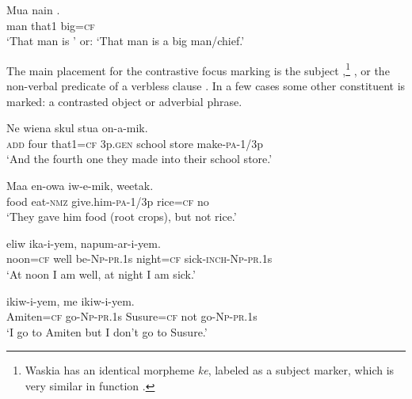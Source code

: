 \ea%
\label{ex:9:x1691}
\gll Mua  nain  . \\
man  that1  big=\textsc{cf}      \\
\glt`That man is \textsc{'} or: `That man is a big man/chief.'
\z


The main placement for the contrastive focus marking is the subject ,\footnote{Waskia has an identical morpheme \textit{ke}, labeled as a subject marker, which is very similar in function \citep[36]{RossEtAl1978}%
.} , or the non-verbal predicate of a verbless clause . In a few cases some other constituent is marked: a contrasted object or adverbial phrase.

\ea%
\label{ex:9:x1692}
\gll Ne     wiena  skul  stua  on-a-mik.\\
\textsc{add}  four  that1=\textsc{cf}  3p.\textsc{gen}  school  store  make-\textsc{pa}-1/3p\\
\glt`And the fourth one they made into their school store.'
\z


\ea%
\label{ex:9:x1697}
\gll Maa  en-owa  iw-e-mik,   weetak. \\
food  eat-\textsc{nmz}  give.him-\textsc{pa}-1/3p  rice=\textsc{cf}  no     \\
\glt`They gave him food (root crops), but not rice.'
\z


\ea%
\label{ex:9:x1693}
\gll {}  eliw  ika-i-yem,    napum-ar-i-yem. \\
noon=\textsc{cf}  well  be-\textsc{Np}-\textsc{pr}.1s  night=\textsc{cf}  sick-\textsc{inch}-\textsc{Np}-\textsc{pr}.1s      \\
\glt`At noon I am well, at night I am sick.'
\z


\ea%
\label{ex:9:x1694}
\gll {}  ikiw-i-yem,    me  ikiw-i-yem. \\
Amiten=\textsc{cf}  go-\textsc{Np}-\textsc{pr}.1s  Susure=\textsc{cf}  not  go-\textsc{Np}-\textsc{pr}.1s      \\
\glt`I go to Amiten but I don't go to Susure.'
\z


